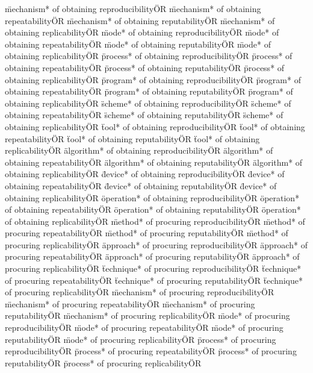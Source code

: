 \documentclass[
10pt, %
a4paper, %
oneside, %
headinclude,footinclude, %
BCOR5mm, %
]{scrartcl}
\begin{document}
\"mechanism* of obtaining reproducibility\" OR \"mechanism* of obtaining repeatability\" OR \"mechanism* of obtaining reputability\" OR \"mechanism* of obtaining replicability\" OR 
\"mode* of obtaining reproducibility\" OR \"mode* of obtaining repeatability\" OR \"mode* of obtaining reputability\" OR \"mode* of obtaining replicability\" OR 
\"process* of obtaining reproducibility\" OR \"process* of obtaining repeatability\" OR \"process* of obtaining reputability\" OR \"process* of obtaining replicability\" OR 
\"program* of obtaining reproducibility\" OR \"program* of obtaining repeatability\" OR \"program* of obtaining reputability\" OR \"program* of obtaining replicability\" OR 
\"scheme* of obtaining reproducibility\" OR \"scheme* of obtaining repeatability\" OR \"scheme* of obtaining reputability\" OR \"scheme* of obtaining replicability\" OR 
\"tool* of obtaining reproducibility\" OR \"tool* of obtaining repeatability\" OR \"tool* of obtaining reputability\" OR \"tool* of obtaining replicability\" OR 
\"algorithm* of obtaining reproducibility\" OR \"algorithm* of obtaining repeatability\" OR \"algorithm* of obtaining reputability\" OR \"algorithm* of obtaining replicability\" OR 
\"device* of obtaining reproducibility\" OR \"device* of obtaining repeatability\" OR \"device* of obtaining reputability\" OR \"device* of obtaining replicability\" OR 
\"operation* of obtaining reproducibility\" OR \"operation* of obtaining repeatability\" OR \"operation* of obtaining reputability\" OR \"operation* of obtaining replicability\" OR 
\"method* of procuring reproducibility\" OR \"method* of procuring repeatability\" OR \"method* of procuring reputability\" OR \"method* of procuring replicability\" OR 
\"approach* of procuring reproducibility\" OR \"approach* of procuring repeatability\" OR \"approach* of procuring reputability\" OR \"approach* of procuring replicability\" OR 
\"technique* of procuring reproducibility\" OR \"technique* of procuring repeatability\" OR \"technique* of procuring reputability\" OR \"technique* of procuring replicability\" OR 
\"mechanism* of procuring reproducibility\" OR \"mechanism* of procuring repeatability\" OR \"mechanism* of procuring reputability\" OR \"mechanism* of procuring replicability\" OR 
\"mode* of procuring reproducibility\" OR \"mode* of procuring repeatability\" OR \"mode* of procuring reputability\" OR \"mode* of procuring replicability\" OR 
\"process* of procuring reproducibility\" OR \"process* of procuring repeatability\" OR \"process* of procuring reputability\" OR \"process* of procuring replicability\" OR 
\end{document}
